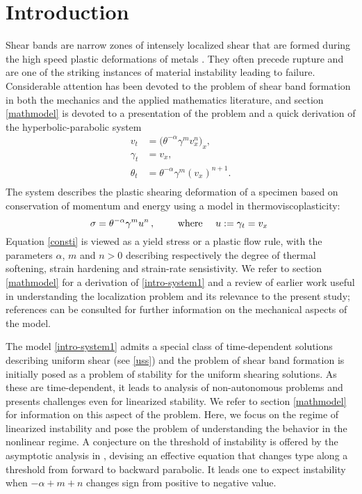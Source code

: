 \documentclass[11pt]{article}
\theoremstyle{remark}
\begin{document}

\section{Introduction}
Shear bands are narrow zones of intensely localized shear that are formed during the high speed plastic deformations of metals \cite{ZH, clifton_rev_1990,wright_survey_2002}.
They often precede rupture and are one of the striking instances of material instability leading to failure.  Considerable attention has been devoted to the
problem of shear band formation in both the mechanics and the applied mathematics literature, and section \ref{mathmodel} is devoted
to a presentation of the problem and a quick derivation of the hyperbolic-parabolic system
\begin{equation}
\label{intro-system1}
\begin{aligned}
v_t &= \big ( \theta^{-\alpha}\gamma^m v_x^n \big )_{x} , \\
 \gamma_t &= v_x ,\\
 \theta_t &= \theta^{-\alpha}\gamma^m (v_x)^{n+1} .\\
\end{aligned}
\end{equation}
The system describes the plastic shearing deformation of a specimen based on conservation of momentum and energy using
a model in thermoviscoplasticity:
\begin{equation}
\label{consti}
\sigma =\theta^{-\alpha}\gamma^m u^n \, , \qquad \mbox{ where \quad $u := \gamma_t = v_x$ }		 %
\end{equation}
Equation \eqref{consti} is viewed as a yield stress or a plastic flow rule, with the parameters $\alpha$, $m$ and $n > 0$ describing respectively the
degree of thermal softening, strain hardening and strain-rate sensistivity.
We refer to section \ref{mathmodel} for a derivation of  \eqref{intro-system1} and a review of earlier work useful in understanding
the localization problem and its relevance to the present study; references \cite{clifton_rev_1990,shawki_shear_1989,wright_survey_2002,KT09}
can be consulted for further information on the mechanical aspects of the model.


The model \eqref{intro-system1} admits a special class of time-dependent solutions describing uniform shear (see \eqref{uss}) and the problem
of shear band formation is initially posed as a problem of stability for the uniform shearing solutions. As these are time-dependent, it leads to
analysis of non-autonomous problems and presents challenges even for linearized stability. We refer to section \ref{mathmodel}
for information on this aspect of the problem. Here, we focus on the regime of linearized instability and pose the problem of
understanding the behavior in the nonlinear regime.  A conjecture on the threshold of instability is offered by the asymptotic analysis in  \cite{KT09},
devising an effective equation that changes type along a threshold from forward to backward parabolic.
 It leads one to expect instability when $-\alpha+m+n$ changes sign from positive to negative value.
\end{document}

